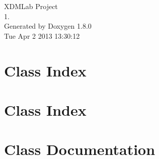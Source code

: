 \documentclass{book}
\begin{document}
\hypersetup{pageanchor=false,citecolor=blue}
\begin{titlepage}
\vspace*{7cm}
\begin{center}
{\Large X\-D\-M\-Lab Project \\[1ex]\large 1. }\\
\vspace*{1cm}
{\large Generated by Doxygen 1.8.0}\\
\vspace*{0.5cm}
{\small Tue Apr 2 2013 13:30:12}\\
\end{center}
\end{titlepage}
\clearemptydoublepage
{}
\tableofcontents
\clearemptydoublepage
{}
\hypersetup{pageanchor=true,citecolor=blue}
\chapter{Class Index}

\chapter{Class Index}

\chapter{Class Documentation}


















\printindex
\end{document}
